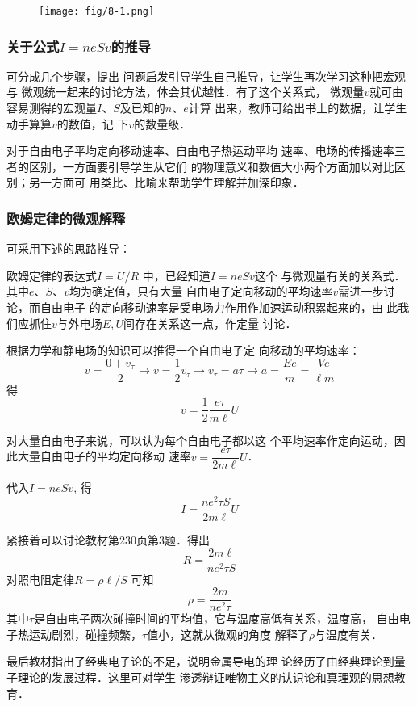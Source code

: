 \begin{figure}[htp]
    \centering
\texttt{[image: fig/8-1.png]}
    \caption{}
\end{figure}

\subsubsection{关于公式$I=neSv$的推导}

可分成几个步骤，提出
问题启发引导学生自己推导，让学生再次学习这种把宏观与
微观统一起来的讨论方法，体会其优越性．有了这个关系式，
微观量$v$就可由容易测得的宏观量$I$、$S$及已知的$n$、$e$计算
出来，教师可给出书上的数据，让学生动手算算$v$的数值，记
下$v$的数量级．

对于自由电子平均定向移动速率、自由电子热运动平均
速率、电场的传播速率三者的区别，一方面要引导学生从它们
的物理意义和数值大小两个方面加以对比区别；另一方面可
用类比、比喻来帮助学生理解并加深印象．

\subsubsection{欧姆定律的微观解释}

可采用下述的思路推导：

欧姆定律的表达式$I=U/R$
中，已经知道$I=neSv$这个
与微观量有关的关系式．其中$e$、$S$、$v$均为确定值，只有大量
自由电子定向移动的平均速率$v$需进一步讨论，而自由电子
的定向移动速率是受电场力作用作加速运动积累起来的，由
此我们应抓住$v$与外电场$E,U$间存在关系这一点，作定量
讨论．

根据力学和静电场的知识可以推得一个自由电子定
向移动的平均速率：
\[v=\frac{0+v_{\tau}}{2}\to v=\frac{1}{2}v_{\tau}\to v_{\tau}=a\tau\to a=\frac{Ee}{m}=\frac{Ve}{\ell m}\]
得\[v=\frac{1}{2}\frac{e\tau }{m\ell }U\]

对大量自由电子来说，可以认为每个自由电子都以这
个平均速率作定向运动，因此大量自由电子的平均定向移动
速率$v=\dfrac{e\tau }{2m\ell }U$．

代入$I=neSv$, 得
\[I=\frac{ne^2\tau S}{2m\ell}U\]

紧接着可以讨论教材第230页第3题．得出
\[R=\frac{2m\ell}{ne^2\tau S}\]
对照电阻定律$R=\rho\ell /S$
可知
\[\rho=\frac{2m}{ne^2\tau}\]
其中$\tau$是自由电子两次碰撞时间的平均值，它与温度高低有关系，温度高，
自由电子热运动剧烈，碰撞频繁，$\tau$值小，这就从微观的角度
解释了$\rho$与温度有关．

最后教材指出了经典电子论的不足，说明金属导电的理
论经历了由经典理论到量子理论的发展过程．这里可对学生
渗透辩证唯物主义的认识论和真理观的思想教育．


